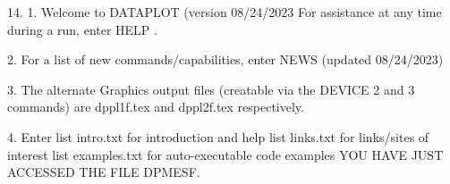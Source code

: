 14.
1. Welcome to DATAPLOT (version 08/24/2023  For assistance at
   any time during a run, enter HELP   .

2. For a list of new commands/capabilities,
   enter NEWS  (updated 08/24/2023)

3. The alternate Graphics output files (creatable
   via the DEVICE 2 and 3 commands) are
   dppl1f.tex and dppl2f.tex respectively.

4. Enter  list intro.txt     for introduction and help
          list links.txt     for links/sites of interest
          list examples.txt  for auto-executable code examples
YOU HAVE JUST ACCESSED THE FILE DPMESF.
